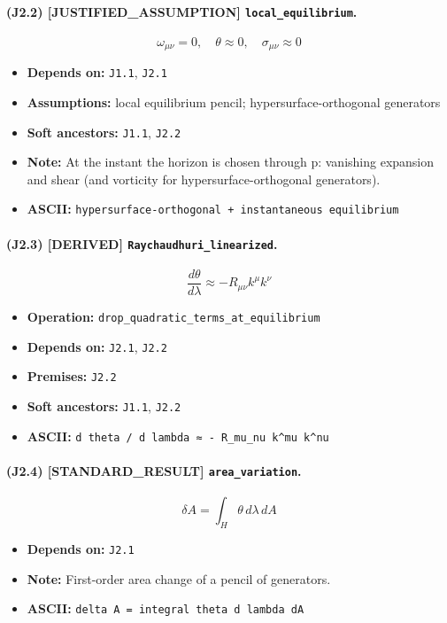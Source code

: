 \documentclass[11pt,a4paper]{article}
\theoremstyle{remark}\newtheorem*{caution}{Caution}
\newcommand{\tagbox}[1]{\textsc{[#1]}}
\begin{document}
\paragraph{(J2.2) \tagbox{JUSTIFIED\_ASSUMPTION} \texttt{local\_equilibrium}.}
\begin{equation}
\omega_{\mu\nu}=0,\quad \theta\approx 0,\quad \sigma_{\mu\nu}\approx 0
\tag{J2.2}
\end{equation}
\begin{itemize}\setlength{\itemsep}{0.12em}
\item \textbf{Depends on:} \texttt{J1.1}, \texttt{J2.1}
\item \textbf{Assumptions:} local equilibrium pencil; hypersurface-orthogonal generators
\item \textbf{Soft ancestors:} \texttt{J1.1}, \texttt{J2.2}
\item \textbf{Note:} At the instant the horizon is chosen through p: vanishing expansion and shear (and vorticity for hypersurface-orthogonal generators).
\item \textbf{ASCII:} \texttt{hypersurface-orthogonal + instantaneous equilibrium}
\end{itemize}
\paragraph{(J2.3) \tagbox{DERIVED} \texttt{Raychaudhuri\_linearized}.}
\begin{equation}
\frac{d\theta}{d\lambda}\approx -R_{\mu\nu}k^\mu k^\nu
\tag{J2.3}
\end{equation}
\begin{itemize}\setlength{\itemsep}{0.12em}
\item \textbf{Operation:} \texttt{drop\_quadratic\_terms\_at\_equilibrium}
\item \textbf{Depends on:} \texttt{J2.1}, \texttt{J2.2}
\item \textbf{Premises:} \texttt{J2.2}
\item \textbf{Soft ancestors:} \texttt{J1.1}, \texttt{J2.2}
\item \textbf{ASCII:} \texttt{d theta / d lambda ≈ - R\_mu\_nu k^mu k^nu}
\end{itemize}
\paragraph{(J2.4) \tagbox{STANDARD\_RESULT} \texttt{area\_variation}.}
\begin{equation}
\delta A=\int_H \theta\,d\lambda\,dA
\tag{J2.4}
\end{equation}
\begin{itemize}\setlength{\itemsep}{0.12em}
\item \textbf{Depends on:} \texttt{J2.1}
\item \textbf{Note:} First-order area change of a pencil of generators.
\item \textbf{ASCII:} \texttt{delta A = integral theta d lambda dA}
\end{itemize}
\end{document}
